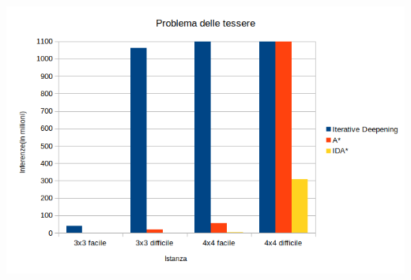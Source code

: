 \documentclass[a4paper,oneside,12pt]{book}
\begin{document}
\begin{center}
        \includegraphics[height=0.65\textwidth]{tessereInferenze}

        \restoregeometry
        \newpage
        \restoregeometry
    \end{center}
\end{document}
